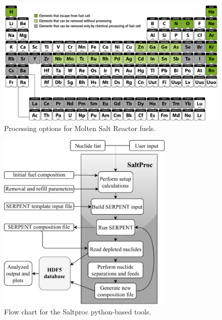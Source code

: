 \documentclass[review]{elsarticle}
\begin{document}
\begin{figure}[htbp!]
    \begin{center}
		\includegraphics[width=\textwidth]{periodic_map.png}
    \end{center}
	\caption{Processing options for Molten Salt Reactor fuels.}
	\label{fig:periodic_tab}
\end{figure}
\begin{figure}[htbp!]
    \begin{center}
		\includegraphics[width=0.75\textwidth]{saltproc_flowchart.pdf}
    \end{center}
  \caption{Flow chart for the Saltproc python-based tools.}
  \label{fig:saltproc_flow}
\end{figure}
\end{document}
